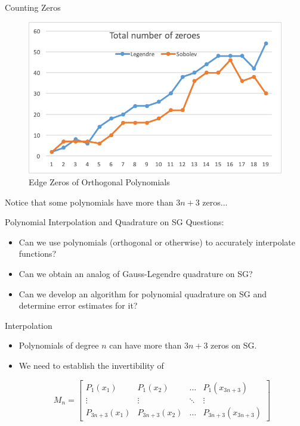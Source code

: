 \documentclass[xcolor = dvipsnames]{beamer}
\begin{document}
\begin{frame}{Counting Zeros}
    \begin{figure}[H]
        \centering
        \includegraphics[width=0.7\linewidth]{images/TotalZeroes.png}
        \caption{Edge Zeros of Orthogonal Polynomials}
        \label{fig:zeros}
    \end{figure}
    
    Notice that some polynomials have more than $3n + 3$ zeros...
\end{frame}

\begin{frame}{Polynomial Interpolation and Quadrature on SG}
Questions:

\begin{itemize}
    \item Can we use polynomials (orthogonal or otherwise) to accurately interpolate functions?
    \item Can we obtain an analog of Gauss-Legendre quadrature on SG?
    \item Can we develop an algorithm for polynomial quadrature on SG and determine error estimates for it?
\end{itemize}
    
\end{frame}

\begin{frame}{Interpolation}
    \begin{itemize}
        \item Polynomials of degree $n$ can have more than $3n+3$ zeros on SG.
        \item We need to establish the invertibility of 
        
        $$
           M_n = \begin{bmatrix}
            P_{1}(x_1) & P_{1}(x_{2}) & \dots & P_{1}(x_{3n+3})\\
            \vdots & \vdots & \ddots & \vdots \\
            P_{3n+3}(x_{1}) & P_{3n+3}(x_{2}) & \dots & P_{3n+3}(x_{3n+3})
            \end{bmatrix}
        $$
    \end{itemize}
    
\end{frame}
\end{document}
